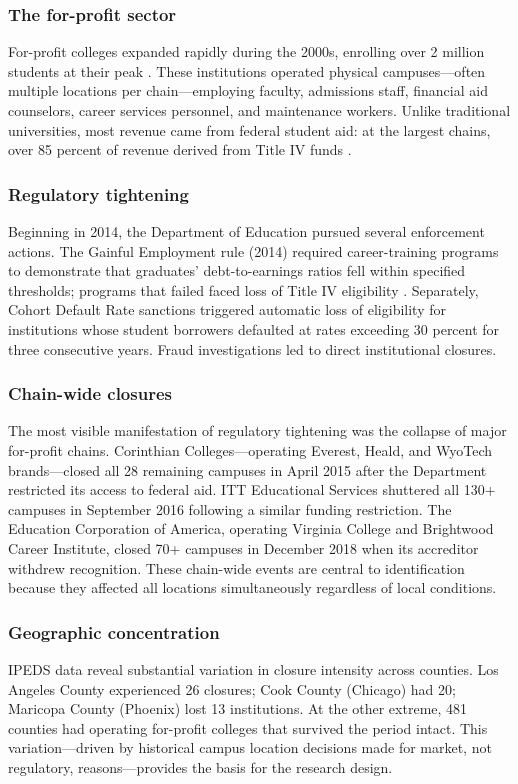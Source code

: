 \documentclass[12pt]{article}
\begin{document}
\subsubsection*{The for-profit sector} For-profit colleges expanded rapidly during the 2000s, enrolling over 2 million students at their peak \citep{deming2012for}. These institutions operated physical campuses---often multiple locations per chain---employing faculty, admissions staff, financial aid counselors, career services personnel, and maintenance workers. Unlike traditional universities, most revenue came from federal student aid: at the largest chains, over 85 percent of revenue derived from Title IV funds \citep{kelchen2017student}.

\subsubsection*{Regulatory tightening} Beginning in 2014, the Department of Education pursued several enforcement actions. The Gainful Employment rule (2014) required career-training programs to demonstrate that graduates' debt-to-earnings ratios fell within specified thresholds; programs that failed faced loss of Title IV eligibility \citep{cellini2023returns}. Separately, Cohort Default Rate sanctions triggered automatic loss of eligibility for institutions whose student borrowers defaulted at rates exceeding 30 percent for three consecutive years. Fraud investigations led to direct institutional closures.

\subsubsection*{Chain-wide closures} The most visible manifestation of regulatory tightening was the collapse of major for-profit chains. Corinthian Colleges---operating Everest, Heald, and WyoTech brands---closed all 28 remaining campuses in April 2015 after the Department restricted its access to federal aid. ITT Educational Services shuttered all 130+ campuses in September 2016 following a similar funding restriction. The Education Corporation of America, operating Virginia College and Brightwood Career Institute, closed 70+ campuses in December 2018 when its accreditor withdrew recognition. These chain-wide events are central to identification because they affected all locations simultaneously regardless of local conditions.

\subsubsection*{Geographic concentration} IPEDS data reveal substantial variation in closure intensity across counties. Los Angeles County experienced 26 closures; Cook County (Chicago) had 20; Maricopa County (Phoenix) lost 13 institutions. At the other extreme, 481 counties had operating for-profit colleges that survived the period intact. This variation---driven by historical campus location decisions made for market, not regulatory, reasons---provides the basis for the research design.
\end{document}
